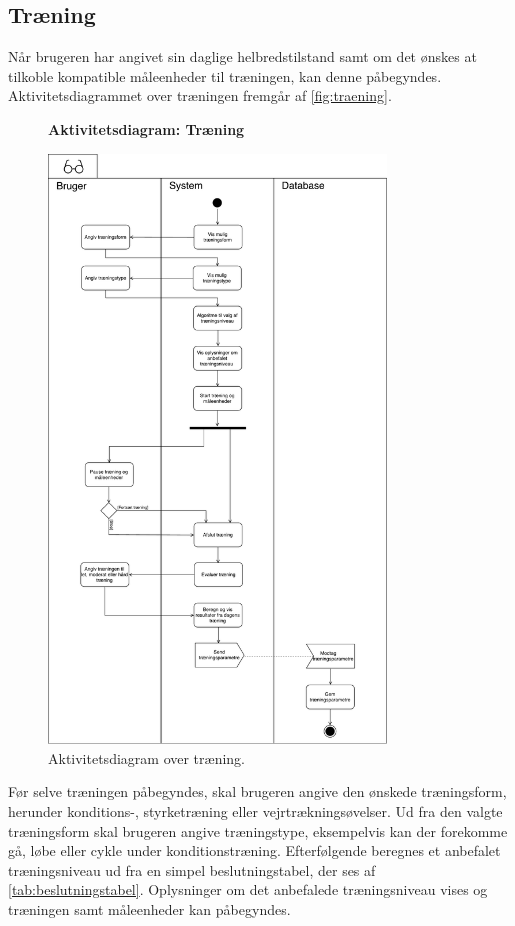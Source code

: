 \subsection*{Træning} \label{sec:traening}
Når brugeren har angivet sin daglige helbredstilstand samt om det ønskes at tilkoble kompatible måleenheder til træningen, kan denne påbegyndes. Aktivitetsdiagrammet over træningen fremgår af \autoref{fig:traening}. 

\begin{figure} [H]
\centering
\textbf{Aktivitetsdiagram: Træning}\par\medskip
\includegraphics[width=0.8\textwidth]{figures/aktivitetsdiagram/NYTraening}
\caption{Aktivitetsdiagram over træning.}
\label{fig:traening}
\end{figure}

\noindent
Før selve træningen påbegyndes, skal brugeren angive den ønskede træningsform, herunder konditions-, styrketræning eller vejrtrækningsøvelser. Ud fra den valgte træningsform skal brugeren angive træningstype, eksempelvis kan der forekomme gå, løbe eller cykle under konditionstræning. Efterfølgende beregnes et anbefalet træningsniveau ud fra en simpel beslutningstabel, der ses af \autoref{tab:beslutningstabel}. Oplysninger om det anbefalede træningsniveau vises og træningen samt måleenheder kan påbegyndes. 

